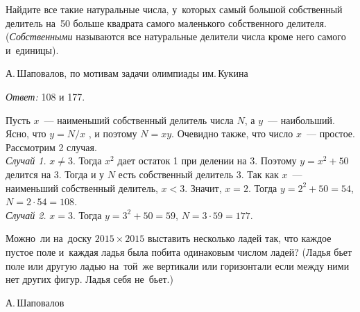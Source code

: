 \begin{problems}

\item
Найдите все такие натуральные числа, у~которых самый большой собственный
делитель на~50 больше квадрата самого маленького собственного делителя.
(\emph{Собственными} называются все натуральные делители числа кроме него самого
и~единицы).
\begin{problem-source}
    А.\,Шаповалов, по мотивам задачи олимпиады им.\,Кукина
\end{problem-source}
\end{problems}

\ifincludesolutions
\emph{Ответ:} 108 и 177.
\par
Пусть $x$~--- наименьший собственный делитель числа $N$, а $y$~--- наибольший.
Ясно, что $y = N / x$ , и поэтому $N = x y$.
Очевидно также, что число $x$~--- простое.
Рассмотрим 2 случая.
\\
\emph{Случай 1.} $x \neq 3$.
Тогда $x^2$ дает остаток 1 при делении на 3.
Поэтому $y = x^2 + 50$ делится на 3.
Тогда и у $N$ есть собственный делитель 3.
Так как $x$~--- наименьший собственный делитель, $x < 3$.
Значит, $x = 2$.
Тогда $y = 2^2 + 50 = 54$, $N = 2 \cdot 54 = 108$.
\\
\emph{Случай 2.} $x = 3$.
Тогда $y = 3^2 + 50 = 59$, $N = 3 \cdot 59 = 177$.
\fi %

\begin{problems}

\item
Можно~ли на~доску $2015 \times 2015$ выставить несколько ладей так, что каждое
пустое поле и~каждая ладья была побита одинаковым числом ладей?
(Ладья бьет поле или другую ладью на~той~же вертикали или горизонтали если
между ними нет других фигур.
Ладья себя не~бьет.)
\begin{problem-source}
    А.\,Шаповалов
\end{problem-source}
\end{problems}

